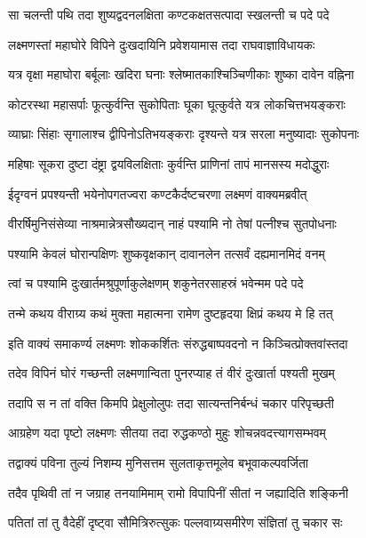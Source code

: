 \twolineshloka
{सा चलन्ती पथि तदा शुष्यद्वदनलक्षिता}
{कण्टकक्षतसत्पादा स्खलन्ती च पदे पदे}%

\twolineshloka
{लक्ष्मणस्तां महाघोरे विपिने दुःखदायिनि}
{प्रवेशयामास तदा राघवाज्ञाविधायकः}%

\twolineshloka
{यत्र वृक्षा महाघोरा बर्बूलाः खदिरा घनाः}
{श्लेष्मातकाश्चिञ्चिणीकाः शुष्का दावेन वह्निना}%

\twolineshloka
{कोटरस्था महासर्पाः फूत्कुर्वन्ति सुकोपिताः}
{घूका घूत्कुर्वते यत्र लोकचित्तभयङ्कराः}%

\twolineshloka
{व्याघ्राः सिंहाः सृगालाश्च द्वीपिनोऽतिभयङ्कराः}
{दृश्यन्ते यत्र सरला मनुष्यादाः सुकोपनाः}%

\twolineshloka
{महिषाः सूकरा दुष्टा दंष्ट्रा द्वयविलक्षिताः}
{कुर्वन्ति प्राणिनां तापं मानसस्य मदोद्धुराः}%

\twolineshloka
{ईदृग्वनं प्रपश्यन्ती भयेनोपगतज्वरा}
{कण्टकैर्दष्टचरणा लक्ष्मणं वाक्यमब्रवीत्}%


\twolineshloka
{वीरर्षिमुनिसंसेव्या नाश्रमान्नेत्रसौख्यदान्}
{नाहं पश्यामि नो तेषां पत्नीश्च सुतपोधनाः}%

\twolineshloka
{पश्यामि केवलं घोरान्पक्षिणः शुष्कवृक्षकान्}
{दावानलेन तत्सर्वं दह्यमानमिदं वनम्}%

\twolineshloka
{त्वां च पश्यामि दुःखार्तमश्रुपूर्णाकुलेक्षणम्}
{शकुनेतरसाहस्रं भवेन्मम पदे पदे}%

\twolineshloka
{तन्मे कथय वीराग्र्य कथं मुक्ता महात्मना}
{रामेण दुष्टहृदया क्षिप्रं कथय मे हि तत्}%

\twolineshloka
{इति वाक्यं समाकर्ण्य लक्ष्मणः शोककर्शितः}
{संरुद्धबाष्पवदनो न किञ्चित्प्रोक्तवांस्तदा}%

\twolineshloka
{तदेव विपिनं घोरं गच्छन्ती लक्ष्मणान्विता}
{पुनरप्याह तं वीरं दुःखार्ता पश्यती मुखम्}%

\twolineshloka
{तदापि स न तां वक्ति किमपि प्रेक्षुलोलुपः}
{तदा सात्यन्तनिर्बन्धं चकार परिपृच्छती}%

\twolineshloka
{आग्रहेण यदा पृष्टो लक्ष्मणः सीतया तदा}
{रुद्धकण्ठो मुहुः शोचन्नवदत्त्यागसम्भवम्}%

\twolineshloka
{तद्वाक्यं पविना तुल्यं निशम्य मुनिसत्तम}
{सुलताकृत्तमूलेव बभूवाकल्पवर्जिता}%

\twolineshloka
{तदैव पृथिवी तां न जग्राह तनयामिमाम्}
{रामो विपापिनीं सीतां न जह्यादिति शङ्किनी}%

\twolineshloka
{पतितां तां तु वैदेहीं दृष्ट्वा सौमित्रिरुत्सुकः}
{पल्लवाग्र्यसमीरेण संज्ञितां तु चकार सः}%

